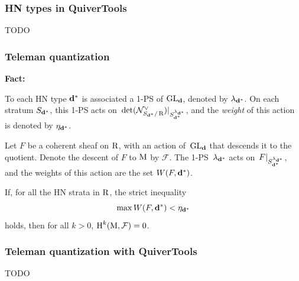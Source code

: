 \documentclass{beamer}
\begin{document}
\begin{frame}
    \frametitle{HN types in QuiverTools}
TODO
\end{frame}

\begin{frame}
    \frametitle{Teleman quantization}
\textbf{Fact:}

To each HN type $\mathbf{d}^*$ is associated a 1-PS of $\operatorname{GL}_{\mathbf{d}}$,
denoted by $\lambda_{\mathbf{d}^*}$.
On each stratum $S_{\mathbf{d}^*}$, this 1-PS acts
on~$\det(\mathcal{N}^{\vee}_{S_{\mathbf{d}^*}/\operatorname{R}})|_{S_{\mathbf{d}^*}^{\lambda_{\mathbf{d}^*}}}$,
and the \emph{weight} of this action is denoted by $\eta_{\mathbf{d}^*}$. \pause

Let $F$ be a coherent sheaf on $\operatorname{R}$, with an action of~$\operatorname{GL}_{\mathbf{d}}$
that descends it to the quotient.
Denote the descent of $F$ to $\operatorname{M}$ by $\mathcal{F}$. \pause
The 1-PS~$\lambda_{\mathbf{d}^*}$ acts on~$F|_{S_{\mathbf{d}^*}^{\lambda_{\mathbf{d}^*}}}$,
and the weights of this action are the set $W(F, \mathbf{d}^*)$. \pause

\begin{theorem}
If, for all the HN strata in $\operatorname{R}$, the strict inequality
\[\max W(F, \mathbf{d}^*) < \eta_{\mathbf{d}^*}\]
holds, then for all $k > 0$, $\operatorname{H}^k(\operatorname{M}, \mathcal{F}) = 0$.
\end{theorem}
\end{frame}

\begin{frame}
    \frametitle{Teleman quantization with QuiverTools}
TODO
\end{frame}
\end{document}
